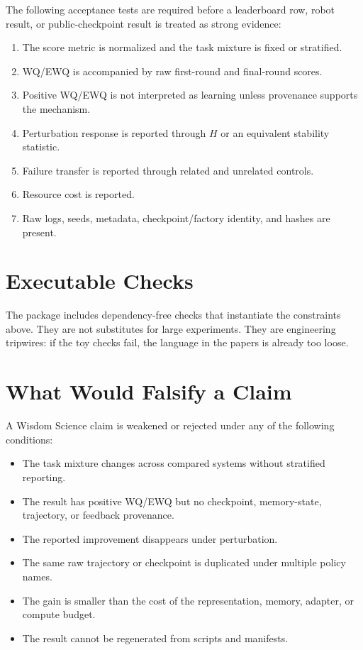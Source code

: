 \documentclass[11pt]{article}
\begin{document}
The following acceptance tests are required before a leaderboard row, robot result, or public-checkpoint result is treated as strong evidence:
\begin{enumerate}[leftmargin=*]
  \item The score metric is normalized and the task mixture is fixed or stratified.
  \item WQ/EWQ is accompanied by raw first-round and final-round scores.
  \item Positive WQ/EWQ is not interpreted as learning unless provenance supports the mechanism.
  \item Perturbation response is reported through $H$ or an equivalent stability statistic.
  \item Failure transfer is reported through related and unrelated controls.
  \item Resource cost is reported.
  \item Raw logs, seeds, metadata, checkpoint/factory identity, and hashes are present.
\end{enumerate}

\section{Executable Checks}

The package includes dependency-free checks that instantiate the constraints above.
They are not substitutes for large experiments.
They are engineering tripwires: if the toy checks fail, the language in the papers is already too loose.

\begin{table}[t]
\centering
\scriptsize
\caption{Physics and engineering executable checks.}

\end{table}

\section{What Would Falsify a Claim}

A Wisdom Science claim is weakened or rejected under any of the following conditions:
\begin{itemize}[leftmargin=*]
  \item The task mixture changes across compared systems without stratified reporting.
  \item The result has positive WQ/EWQ but no checkpoint, memory-state, trajectory, or feedback provenance.
  \item The reported improvement disappears under perturbation.
  \item The same raw trajectory or checkpoint is duplicated under multiple policy names.
  \item The gain is smaller than the cost of the representation, memory, adapter, or compute budget.
  \item The result cannot be regenerated from scripts and manifests.
\end{itemize}
\end{document}
